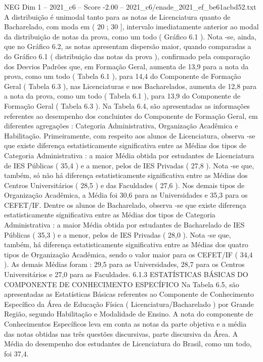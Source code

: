 \begin{textsample}{NEG Dim 1 – 2021\_c6 – Score -2.00 – 2021\_c6/enade\_2021\_ef\_be61acbd52.txt}
A distribuição é unimodal tanto para as notas de Licenciatura quanto de Bacharelado, com moda em ( 20 ; 30 ], intervalo imediatamente anterior ao modal da distribuição de notas da prova, como um todo ( Gráfico 6.1 ).
Nota -se, ainda, que no Gráfico 6.2, as notas apresentam dispersão maior, quando comparadas a do Gráfico 6.1 ( distribuição das notas da prova ), confirmado pela comparação dos Desvios Padrões que, em Formação Geral, aumenta de 13,9 para a nota da prova, como um todo ( Tabela 6.1 ), para 14,4 do Componente de Formação Geral ( Tabela 6.3 ), nas Licenciaturas e nos Bacharelados, aumenta de 12,8 para a nota da prova, como um todo ( Tabela 6.1 ), para 13,9 do Componente de Formação Geral ( Tabela 6.3 ).
Na Tabela 6.4, são apresentadas as informações referentes ao desempenho dos concluintes do Componente de Formação Geral, em diferentes agregações : Categoria Administrativa, Organização Acadêmica e Habilitação.
Primeiramente, com respeito aos alunos de Licenciatura, observa -se que existe diferença estatisticamente significativa entre as Médias dos tipos de Categoria Administrativa : a maior Média obtida por estudantes de Licenciatura de IES Públicas ( 35,4 ) e a menor, pelos de IES Privadas ( 27,8 ).
Nota -se que, também, só não há diferença estatisticamente significativa entre as Médias dos Centros Universitários ( 28,5 ) e das Faculdades ( 27,6 ).
Nos demais tipos de Organização Acadêmica, a Média foi 30,6 para as Universidades e 35,3 para os CEFET/IF.
Dentre os alunos de Bacharelado, observa -se que existe diferença estatisticamente significativa entre as Médias dos tipos de Categoria Administrativa : a maior Média obtida por estudantes de Bacharelado de IES Públicas ( 35,3 ) e a menor, pelos de IES Privadas ( 28,0 ).
Nota -se que, também, há diferença estatisticamente significativa entre as Médias dos quatro tipos de Organização Acadêmica, sendo o valor maior para os CEFET/IF ( 34,4 ).
As demais Médias foram : 29,5 para as Universidades, 28,7 para os Centros Universitários e 27,0 para as Faculdades. 6.1.3 ESTATÍSTICAS BÁSICAS DO COMPONENTE DE CONHECIMENTO ESPECÍFICO Na Tabela 6.5, são apresentadas as Estatísticas Básicas referentes ao Componente de Conhecimento Específico da Área de Educação Física ( Licenciatura/Bacharelado ) por Grande Região, segundo Habilitação e Modalidade de Ensino.
A nota do componente de Conhecimentos Específicos leva em conta as notas da parte objetiva e a média das notas obtidas nas três questões discursivas, parte discursiva da Área.
A Média do desempenho dos estudantes de Licenciatura do Brasil, como um todo, foi 37,4.

\end{textsample}
